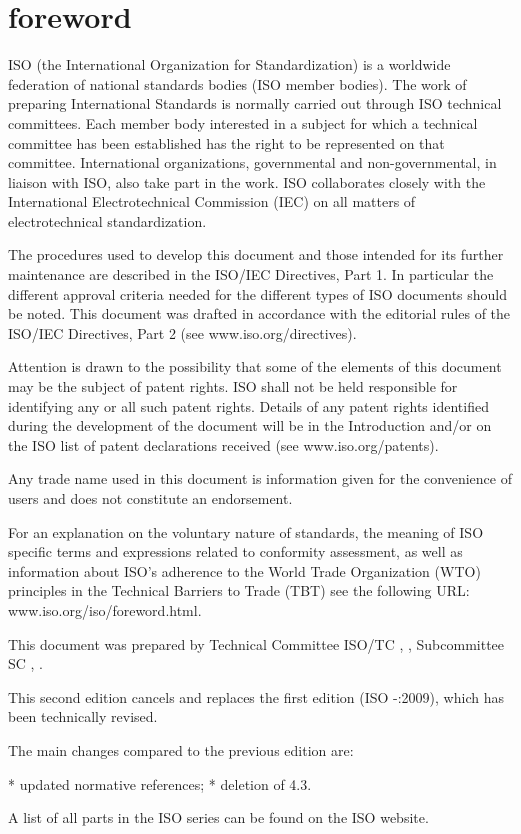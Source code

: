 \section{foreword}

ISO (the International Organization for Standardization)
is a worldwide federation of national standards bodies (ISO member bodies). The work of preparing International Standards is normally carried out through ISO technical committees. Each member body interested in a subject for which a technical committee has been established has the right to be represented on that committee. International organizations, governmental and non-governmental, in liaison with ISO, also take part in the work. ISO collaborates closely with the International Electrotechnical Commission (IEC) on all matters of electrotechnical standardization.

The procedures used to develop this document and those intended for its further maintenance are described in the ISO/IEC Directives, Part 1. In particular the different approval criteria needed for the different types of ISO documents should be noted. This document was drafted in accordance with the editorial rules of the ISO/IEC Directives, Part 2 (see www.iso.org/directives).

Attention is drawn to the possibility that some of the elements of this document may be the subject of patent rights. ISO shall not be held responsible for identifying any or all such patent rights. Details of any patent rights identified during the development of the document will be in the Introduction and/or on the ISO list of patent declarations received (see www.iso.org/patents).

Any trade name used in this document is information given for the convenience of users and does not constitute an endorsement.

For an explanation on the voluntary nature of standards, the meaning of ISO specific terms and expressions related to conformity assessment, as well as information about ISO's adherence to the World Trade Organization (WTO) principles in the Technical Barriers to Trade (TBT) see the following URL: www.iso.org/iso/foreword.html.

This document was prepared by Technical Committee ISO/TC , \textit{}, Subcommittee SC , \textit{}.

This second edition cancels and replaces the first edition (ISO -:2009), which has been technically revised.

The main changes compared to the previous edition are:

* updated normative references;
* deletion of 4.3.

A list of all parts in the ISO  series can be found on the ISO website.


